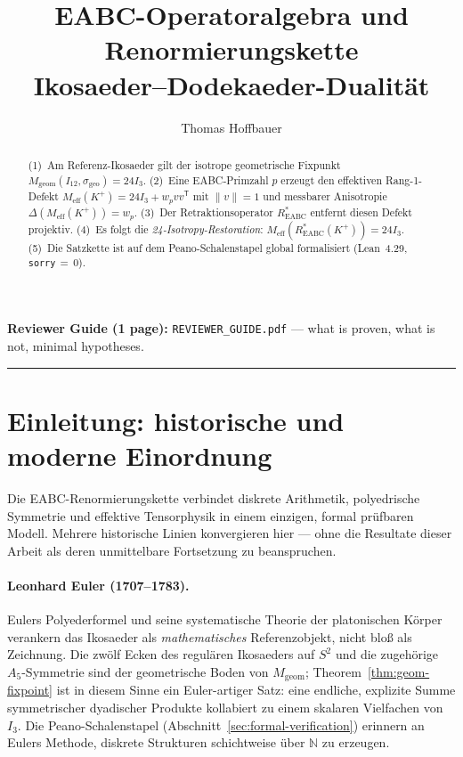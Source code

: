 \documentclass[11pt,a4paper]{article}
\title{EABC-Operatoralgebra und Renormierungskette\\[0.3em]
	\large Ikosaeder--Dodekaeder-Dualität}
\author{Thomas Hoffbauer}
\date{}
\begin{document}
	\maketitle
	
	\noindent\small
	\textbf{Reviewer Guide (1 page):}
	\texttt{REVIEWER\_GUIDE.pdf} --- what is proven, what is not, minimal hypotheses.
	\hrule
	\vspace{0.5em}
	
	\begin{abstract}
		\noindent
		(1)~Am Referenz-Ikosaeder gilt der isotrope geometrische Fixpunkt
		$M_{\mathrm{geom}}(I_{12},\sigma_{\mathrm{geo}})=24I_3$.
		(2)~Eine EABC-Primzahl $p$ erzeugt den effektiven Rang-1-Defekt
		$M_{\mathrm{eff}}(K^+)=24I_3+w_pvv^{\mathsf T}$ mit $\|v\|=1$ und messbarer
		Anisotropie $\Delta(M_{\mathrm{eff}}(K^+))=w_p$.
		(3)~Der Retraktionsoperator $R^*_{\mathrm{EABC}}$ entfernt diesen Defekt projektiv.
		(4)~Es folgt die \emph{24-Isotropy-Restoration}:
		$M_{\mathrm{eff}}(R^*_{\mathrm{EABC}}(K^+))=24I_3$.
		(5)~Die Satzkette ist auf dem Peano-Schalenstapel global formalisiert
		(Lean~4.29, \texttt{sorry}\,$=\,0$).
	\end{abstract}
	
	\section{Einleitung: historische und moderne Einordnung}
	\label{sec:introduction}
	
	Die EABC-Renormierungskette verbindet diskrete Arithmetik, polyedrische Symmetrie
	und effektive Tensorphysik in einem einzigen, formal prüfbaren Modell.
	Mehrere historische Linien konvergieren hier --- ohne die Resultate dieser Arbeit
	als deren unmittelbare Fortsetzung zu beanspruchen.
	
	\paragraph{Leonhard Euler (1707--1783).}
	Eulers Polyederformel und seine systematische Theorie der platonischen Körper
	verankern das Ikosaeder als \emph{mathematisches} Referenzobjekt, nicht bloß als
	Zeichnung.
	Die zwölf Ecken des regulären Ikosaeders auf $S^2$ und die zugehörige
	$A_5$-Symmetrie sind der geometrische Boden von $M_{\mathrm{geom}}$;
	Theorem~\ref{thm:geom-fixpoint} ist in diesem Sinne ein Euler-artiger Satz:
	eine endliche, explizite Summe symmetrischer dyadischer Produkte kollabiert
	zu einem skalaren Vielfachen von $I_3$.
	Die Peano-Schalenstapel (Abschnitt~\ref{sec:formal-verification}) erinnern an
	Eulers Methode, diskrete Strukturen schichtweise über $\mathbb{N}$ zu erzeugen.
	
\end{document}
